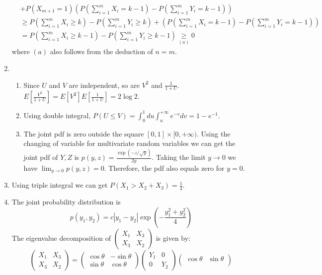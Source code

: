 \documentclass{article}
\begin{document}
\begin{enumerate}
\begin{align*}
    &+P(X_{m+1}=1)(P(\sum_{i=1}^{m} X_{i} = k-1) - P(\sum_{i=1}^{m} Y_{i} = k-1))\\
    &\geq P(\sum_{i=1}^{m} X_{i} \geq k)- P(\sum_{i=1}^{m} Y_{i} \geq k)
    +(P(\sum_{i=1}^{m} X_{i} = k-1) - P(\sum_{i=1}^{m} Y_{i} = k-1)) \\
    &=P(\sum_{i=1}^{m} X_{i} \geq k-1)- P(\sum_{i=1}^{m} Y_{i} \geq k-1) \underset{(a)}{\geq} 0
\end{align*}
where $(a)$ also follows from the deduction of $n=m$.
\item
\begin{enumerate}
    \item Since $U$ and $V$ are independent,
    so are $V^2$ and $\frac{1}{1+U}$.
    $E[\frac{V^2}{1+U}] = E[V^2]E[\frac{1}{1+U}] = 2\log 2
    $.
    \item Using double integral, $P(U\leq V) = \int_0^1 du
    \int_u^{+\infty} e^{-v} dv = 1-e^{-1}$.
    \item The joint pdf is zero outside the square $[0,1] \times [0,+\infty)$.
    Using the changing of variable for multivariate random variables we
    can get the joint pdf of $Y,Z$ is $p(y,z)=\frac{\exp(-z/\sqrt{y})}{2y}$. Taking the limit
    $y\to 0$ we have $\lim_{y\to 0}p(y,z)=0$. Therefore,
    the pdf also equals zero for $y=0$.
\end{enumerate}
\item Using triple integral we can get $P(X_1 > X_2 + X_3) = \frac{1}{4}$.
\item The joint probability distribution is
\begin{equation}\label{eq:y1y2}
p(y_1, y_2) = c |y_1 - y_2| \exp(-\frac{y_1^2+ y_2^2}{4})
\end{equation}
The eigenvalue decomposition of $\begin{pmatrix}
X_1 & X_3 \\
X_3 & X_2
\end{pmatrix}
$ is given by:
$$
\begin{pmatrix}
X_1 & X_3 \\
X_3 & X_2
\end{pmatrix} =
\begin{pmatrix}
\cos \theta & -\sin\theta \\
\sin\theta & \cos\theta
\end{pmatrix}
\begin{pmatrix}
Y_1 & 0 \\
0 & Y_2
\end{pmatrix}
\begin{pmatrix}
\cos \theta & \sin\theta \\

\end{pmatrix}$$
\end{enumerate}
\end{document}
